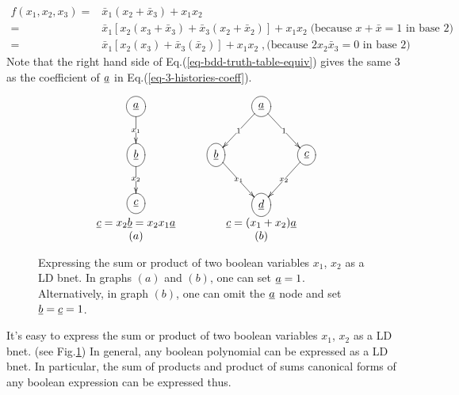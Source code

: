 \begin{align}
f(x_1, x_2,x_3) =&
\bar{x}_1(x_2+\bar{x}_3)  + x_1 x_2
\\
=&
\bar{x}_1[x_2(x_3+\bar{x}_3)+\bar{x}_3
(x_2+ \bar{x}_2)]  + x_1 x_2
\;\text{(because $x+\bar{x}=1$ in base 2)}
\\
=&
\bar{x}_1[x_2(x_3)+\bar{x}_3
(\bar{x}_2)]  + x_1 x_2\;, \text{
(because $2x_2\bar{x}_3=0$ in base 2)
}
\label{eq-bdd-truth-table-equiv}
\end{align}
Note that the right 
hand side of Eq.(\ref{eq-bdd-truth-table-equiv})
gives the same 3 
as the coefficient of $\rva$ in
 Eq.(\ref{eq-3-histories-coeff}).

\begin{figure}[h!]
$$
\begin{array}{ccc}
\xymatrix{
\Circle{\rva}
\ar[d]|{x_1}
\\
\Circle{\rvb}
\ar[d]|{x_2}
\\
\Circle{\rvc}
}
&\;\;\;&
\xymatrix{
&\Circle{\rva}\ar[dl]|1
\ar[dr]|1
\\
\Circle{\rvb}\ar[dr]|{x_1}
&&\Circle{\rvc}\ar[dl]|{x_2}
\\
&\Circle{\rvd}
}
\\
\rvc=x_2\rvb=x_2x_1\rva
&&
\rvc= (x_1 + x_2)\rva
\\
(a)&&(b)
\end{array}
$$
\caption{Expressing the sum or product 
of two boolean variables $x_1$, $x_2$ 
as a LD bnet. In graphs $(a)$ and $(b)$,
one can set $\rva=1$. Alternatively,
in graph $(b)$, one  can
omit the $\rva$ node and set $\rvb=\rvc=1$.}
\label{fig-bdd-and-or}
\end{figure}

It's easy to  express the sum or product 
of two boolean variables $x_1$, $x_2$ 
as a LD bnet.
(see Fig.\ref{fig-bdd-and-or})
In general, any boolean polynomial
can be expressed as a LD bnet. In particular, the sum of products and product of sums
canonical forms
of any boolean expression can be expressed 
thus.